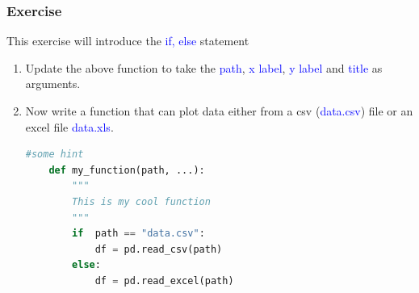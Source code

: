 \documentclass[10pt,a4paper,titlepage]{article}
\begin{document}
\subsubsection{Exercise}
This exercise will introduce the \textcolor{blue}{if, else} statement
\begin{enumerate}
	\item Update the above function to take the \textcolor{blue}{path}, \textcolor{blue}{x label}, \textcolor{blue}{y label} and \textcolor{blue}{title} as arguments.
	\item Now write a function that can plot data either from a csv (\textcolor{blue}{data.csv}) file or an excel file \textcolor{blue}{data.xls}.
	\begin{lstlisting}[language=python]
	#some hint
	def my_function(path, ...):
		"""
		This is my cool function
		"""
		if  path == "data.csv":
			df = pd.read_csv(path)
		else:
			df = pd.read_excel(path)
		
	\end{lstlisting}
\end{enumerate}
\end{document}
